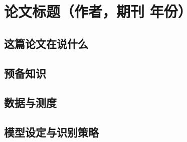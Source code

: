 \chapter{论文标题（作者，期刊 年份）}
\label{ch:CHANGEME}

\section{这篇论文在说什么}

\section{预备知识}

\section{数据与测度}

\section{模型设定与识别策略}


